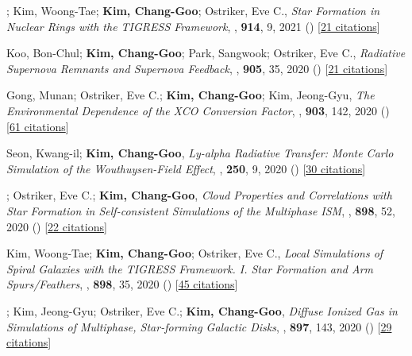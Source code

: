 \item[{22.}]; Kim, Woong-Tae; \textbf{Kim, Chang-Goo}; Ostriker, Eve C., \textit{Star Formation in Nuclear Rings with the TIGRESS Framework}, , \textbf{914}, 9, 2021 () [\href{http://adsabs.harvard.edu/abs/2021ApJ...914....9M}{21 citations}]

\item[{21.}]Koo, Bon-Chul; \textbf{Kim, Chang-Goo}; Park, Sangwook; Ostriker, Eve C., \textit{Radiative Supernova Remnants and Supernova Feedback}, , \textbf{905}, 35, 2020 () [\href{http://adsabs.harvard.edu/abs/2020ApJ...905...35K}{21 citations}]

\item[{20.}]Gong, Munan; Ostriker, Eve C.; \textbf{Kim, Chang-Goo}; Kim, Jeong-Gyu, \textit{The Environmental Dependence of the XCO Conversion Factor}, , \textbf{903}, 142, 2020 () [\href{http://adsabs.harvard.edu/abs/2020ApJ...903..142G}{61 citations}]

\item[{19.}]Seon, Kwang-il; \textbf{Kim, Chang-Goo}, \textit{Ly-alpha Radiative Transfer: Monte Carlo Simulation of the Wouthuysen-Field Effect}, , \textbf{250}, 9, 2020 () [\href{http://adsabs.harvard.edu/abs/2020ApJS..250....9S}{30 citations}]

\item[{18.}]; Ostriker, Eve C.; \textbf{Kim, Chang-Goo}, \textit{Cloud Properties and Correlations with Star Formation in Self-consistent Simulations of the Multiphase ISM}, , \textbf{898}, 52, 2020 () [\href{http://adsabs.harvard.edu/abs/2020ApJ...898...52M}{22 citations}]

\item[{17.}]Kim, Woong-Tae; \textbf{Kim, Chang-Goo}; Ostriker, Eve C., \textit{Local Simulations of Spiral Galaxies with the TIGRESS Framework. I. Star Formation and Arm Spurs/Feathers}, , \textbf{898}, 35, 2020 () [\href{http://adsabs.harvard.edu/abs/2020ApJ...898...35K}{45 citations}]

\item[{16.}]; Kim, Jeong-Gyu; Ostriker, Eve C.; \textbf{Kim, Chang-Goo}, \textit{Diffuse Ionized Gas in Simulations of Multiphase, Star-forming Galactic Disks}, , \textbf{897}, 143, 2020 () [\href{http://adsabs.harvard.edu/abs/2020ApJ...897..143K}{29 citations}]

